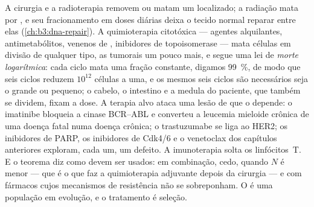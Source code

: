 \begin{example}\label{ex:b3:cancer-biology:therapy}
A cirurgia e a radioterapia removem ou matam um  localizado; a
radiação mata por , e seu fracionamento em doses
diárias deixa o tecido normal reparar entre elas
(\cref{ch:b3:dna-repair}). A quimioterapia citotóxica --- agentes
alquilantes, antimetabólitos, venenos de , inibidores de
topoisomerase --- mata células em divisão de qualquer tipo, as
tumorais um pouco mais, e segue uma lei de \emph{morte logarítmica}:
cada ciclo mata uma fração constante, digamos \qty{99}{\%}, de modo que
seis ciclos reduzem $10^{12}$ células a uma, e os mesmos seis ciclos
são necessários seja o  grande ou pequeno; o cabelo, o intestino e
a medula do paciente, que também se dividem, fixam a dose. A terapia
alvo ataca uma lesão de que o  depende: o imatinibe bloqueia a
cinase BCR--ABL e converteu a leucemia mieloide crônica de uma doença
fatal numa doença crônica; o trastuzumabe se liga ao HER2; os
inibidores de PARP, os inibidores de Cdk4/6 e o venetoclax dos
capítulos anteriores exploram, cada um, um defeito. A imunoterapia
solta os linfócitos~T. E o teorema diz como devem ser usados: em
combinação, cedo, quando $N$ é menor --- que é o que faz a quimioterapia
adjuvante depois da cirurgia --- e com fármacos cujos mecanismos de
resistência não se sobreponham. O  é uma população em evolução, e
o tratamento é seleção.
\end{example}

